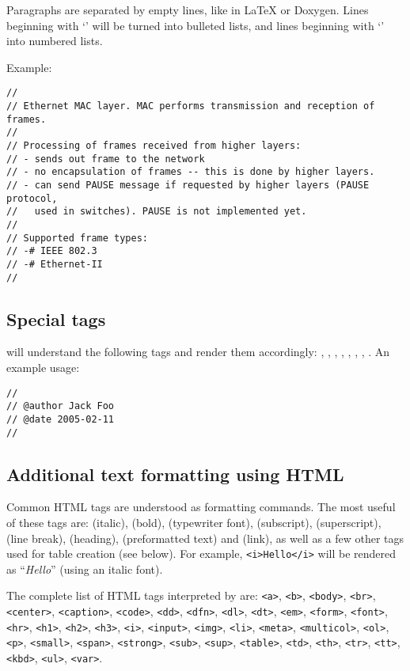 Paragraphs are separated by empty lines, like in LaTeX or Doxygen.
Lines beginning with `\ttt{-}' will be turned into bulleted lists,
and lines beginning with `\ttt{-\#}' into numbered lists.

Example:

\begin{verbatim}
//
// Ethernet MAC layer. MAC performs transmission and reception of frames.
//
// Processing of frames received from higher layers:
// - sends out frame to the network
// - no encapsulation of frames -- this is done by higher layers.
// - can send PAUSE message if requested by higher layers (PAUSE protocol,
//   used in switches). PAUSE is not implemented yet.
//
// Supported frame types:
// -# IEEE 802.3
// -# Ethernet-II
//
\end{verbatim}


\subsection{Special tags}

 will understand the following tags and render them accordingly:
, , , , , ,
, . An example usage:

\begin{verbatim}
//
// @author Jack Foo
// @date 2005-02-11
//
\end{verbatim}


\subsection{Additional text formatting using HTML}

Common HTML tags are understood as formatting commands.
The most useful of these tags are:  (italic),
 (bold),  (typewriter font),
 (subscript),  (superscript),
 (line break),  (heading),
 (preformatted text) and  (link),
as well as a few other tags used for table creation (see below).
For example, \texttt{<i>Hello</i>} will be rendered as ``\textit{Hello}''
(using an italic font).

The complete list of HTML tags interpreted by  are:
\texttt{<a>}, \texttt{<b>}, \texttt{<body>}, \texttt{<br>}, \texttt{<center>},
\texttt{<caption>}, \texttt{<code>}, \texttt{<dd>}, \texttt{<dfn>}, \texttt{<dl>},
\texttt{<dt>}, \texttt{<em>}, \texttt{<form>}, \texttt{<font>}, \texttt{<hr>},
\texttt{<h1>}, \texttt{<h2>}, \texttt{<h3>}, \texttt{<i>}, \texttt{<input>}, \texttt{<img>},
\texttt{<li>}, \texttt{<meta>}, \texttt{<multicol>}, \texttt{<ol>}, \texttt{<p>}, \texttt{<small>},
\texttt{<span>}, \texttt{<strong>},
\texttt{<sub>}, \texttt{<sup>}, \texttt{<table>}, \texttt{<td>}, \texttt{<th>}, \texttt{<tr>},
\texttt{<tt>}, \texttt{<kbd>}, \texttt{<ul>}, \texttt{<var>}.

